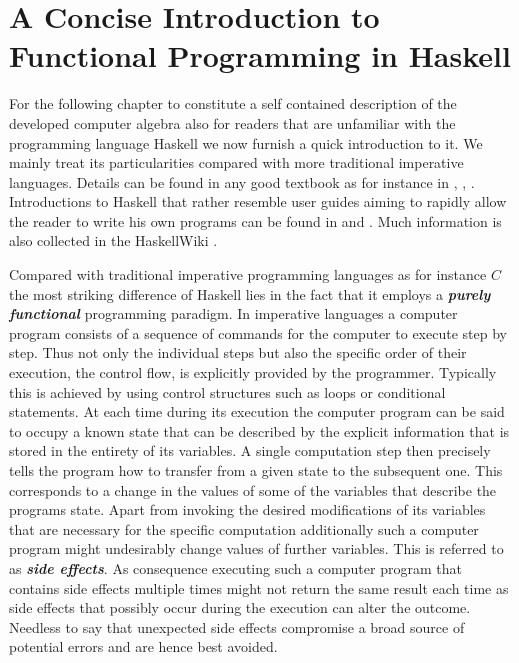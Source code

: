 \documentclass[a4paper,12pt, DIV=14, BCOR=5mm, twoside, headsepline, numbers=noenddot]{scrbook}
\begin{document}
\section{A Concise Introduction to Functional Programming in Haskell}
For the following chapter to constitute a self contained description of the developed computer algebra also for readers that are unfamiliar with the programming language Haskell \cite{Marlow_haskell2010} we now furnish a quick introduction to it. We mainly treat its particularities compared with more traditional imperative languages.
Details can be found in any good textbook as for instance in \cite{Thompson99thecraft}, \cite{bird_2014}, \cite{hutton_2007}. Introductions to Haskell that rather resemble user guides aiming to rapidly allow the reader to write his own programs can be found in  \cite{OSullivan2008} and  \cite{Lipovaca:2011:LYH:2018642}. Much information is also collected in the HaskellWiki \cite{wiki:xxx}.

Compared with traditional imperative programming languages as for instance $C$ the most striking difference of Haskell lies in the fact that it employs a \textbf{\textit{purely functional}} programming paradigm. In imperative languages a computer program consists of a sequence of commands for the computer to execute step by step. Thus not only the individual steps but also the specific order of their execution, the control flow, is explicitly provided by the programmer. Typically this is achieved by using control structures such as loops or conditional statements. At each time during its execution the computer program can be said to occupy a known state that can be described by the explicit information that is stored in the entirety of its variables. A single computation step then precisely tells the program how to transfer from a given state to the subsequent one. This corresponds to a change in the values of some of the variables that describe the programs state. Apart from invoking the desired modifications of its variables that are necessary for the specific computation additionally such a computer program might undesirably change values of further variables. This is referred to as \textit{\textbf{side effects}}. As consequence executing such a computer program that contains side effects multiple times might not return the same result each time as side effects that possibly occur during the execution can alter the outcome. Needless to say that unexpected side effects compromise a broad source of potential errors and are hence best avoided.
\end{document}
